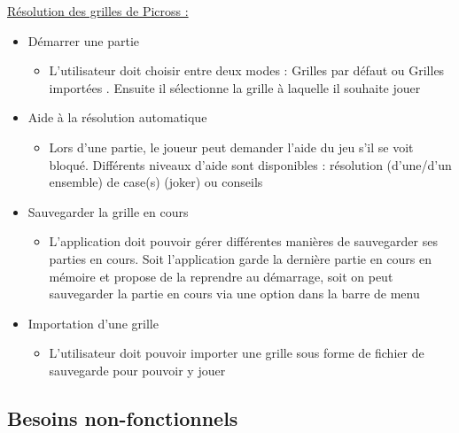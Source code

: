 \documentclass[a4paper, 12pt, twoside]{article}
\begin{document}
\ul{R\'esolution des grilles de Picross :}\newline

\begin{itemize}\setlength{\itemsep}{5mm}

 \item[\textbullet] Démarrer une partie\newline
 \begin{itemize}
  \item L'utilisateur doit choisir entre deux modes : \og Grilles par défaut \fg ou \og Grilles importées \fg. Ensuite il sélectionne la grille à laquelle il souhaite jouer
 \end{itemize}

 \item[\textbullet] Aide à la résolution automatique\newline
 \begin{itemize}
  \item Lors d'une partie, le joueur peut demander l'aide du jeu s'il se voit bloqué. Différents niveaux d'aide sont disponibles : résolution (d'une/d'un ensemble) de case(s) (joker) ou conseils
 \end{itemize}
 
 \item[\textbullet] Sauvegarder la grille en cours\newline
 \begin{itemize}
  \item L'application doit pouvoir gérer différentes manières de sauvegarder ses parties en cours. Soit l'application garde la dernière partie en cours en mémoire et propose de la reprendre au démarrage, soit on peut sauvegarder la partie en cours via une option dans la barre de menu
 \end{itemize}
 
 \item[\textbullet] Importation d'une grille\newline
 \begin{itemize}
  \item L'utilisateur doit pouvoir importer une grille sous forme de fichier de sauvegarde pour pouvoir y jouer
 \end{itemize}
 
\end{itemize}

\subsection{Besoins non-fonctionnels}
\end{document}
